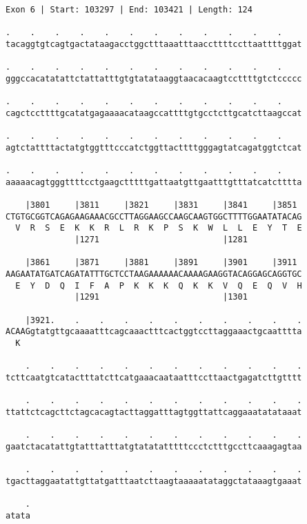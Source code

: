 \documentclass{article}
\begin{document}
\newpage
\begin{Verbatim}
Exon 6 | Start: 103297 | End: 103421 | Length: 124
 
.    .    .    .    .    .    .    .    .    .    .    .    
tacaggtgtcagtgactataagacctggctttaaatttaaccttttccttaattttggat
  
.    .    .    .    .    .    .    .    .    .    .    .    
gggccacatatattctattatttgtgtatataaggtaacacaagtccttttgtctccccc
  
.    .    .    .    .    .    .    .    .    .    .    .    
cagctccttttgcatatgagaaaacataagccattttgtgcctcttgcatcttaagccat
  
.    .    .    .    .    .    .    .    .    .    .    .    
agtctattttactatgtggtttcccatctggttacttttgggagtatcagatggtctcat
  
.    .    .    .    .    .    .    .    .    .    .    .    
aaaaacagtgggttttcctgaagctttttgattaatgttgaatttgtttatcatctttta
  
    |3801     |3811     |3821     |3831     |3841     |3851 
CTGTGCGGTCAGAGAAGAAACGCCTTAGGAAGCCAAGCAAGTGGCTTTTGGAATATACAG
  V  R  S  E  K  K  R  L  R  K  P  S  K  W  L  L  E  Y  T  E
              |1271                         |1281           
  
    |3861     |3871     |3881     |3891     |3901     |3911 
AAGAATATGATCAGATATTTGCTCCTAAGAAAAAACAAAAGAAGGTACAGGAGCAGGTGC
  E  Y  D  Q  I  F  A  P  K  K  K  Q  K  K  V  Q  E  Q  V  H
              |1291                         |1301           
  
    |3921.    .    .    .    .    .    .    .    .    .    .
ACAAGgtatgttgcaaaatttcagcaaactttcactggtccttaggaaactgcaatttta
  K                                                         
  
    .    .    .    .    .    .    .    .    .    .    .    .
tcttcaatgtcatactttatcttcatgaaacaataatttccttaactgagatcttgtttt
  
    .    .    .    .    .    .    .    .    .    .    .    .
ttattctcagcttctagcacagtacttaggatttagtggttattcaggaaatatataaat
  
    .    .    .    .    .    .    .    .    .    .    .    .
gaatctacatattgtatttatttatgtatatatttttccctctttgccttcaaagagtaa
  
    .    .    .    .    .    .    .    .    .    .    .    .
tgacttaggaatattgttatgatttaatcttaagtaaaaatataggctataaagtgaaat
  
    .
atata
\end{Verbatim}
\newpage
\end{document}
